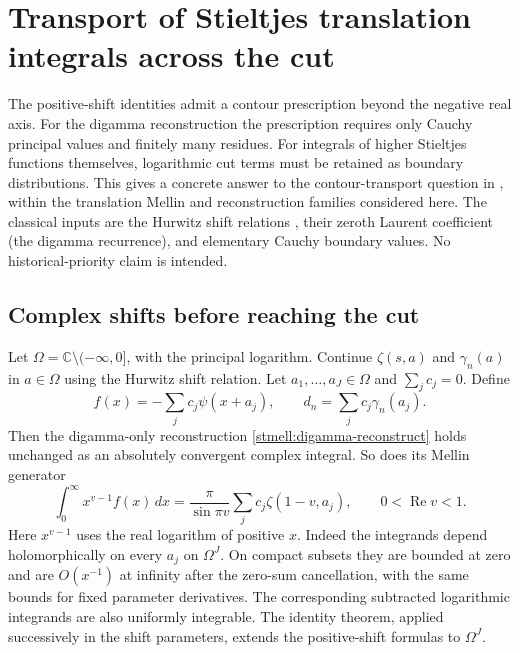 \section{Transport of Stieltjes translation integrals across the cut}
\label{stcut:section}
The positive-shift identities admit a contour prescription beyond the
negative real axis. For the digamma reconstruction the prescription
requires only Cauchy principal values and finitely many residues.
For integrals of higher Stieltjes functions themselves, logarithmic
cut terms must be retained as boundary distributions. This gives a
concrete answer to the contour-transport question in
\cite[Further research, question 2]{stmell:balanced}, within the
translation Mellin and reconstruction families considered here.
The classical inputs are the Hurwitz shift relations
\cite[Eqs.~25.11.3--25.11.4]{intdist:DLMFHurwitz}, their zeroth
Laurent coefficient (the digamma recurrence), and elementary
Cauchy boundary values. No historical-priority claim is intended.

\subsection{Complex shifts before reaching the cut}
Let $\Omega=\mathbb C\setminus(-\infty,0]$, with the principal logarithm.
Continue $\zeta(s,a)$ and $\gamma_n(a)$ in $a\in\Omega$ using the
Hurwitz shift relation. Let $a_1,\ldots,a_J\in\Omega$ and
$\sum_jc_j=0$. Define
\[
 f(x)=-\sum_jc_j\psi(x+a_j),\qquad d_n=\sum_jc_j\gamma_n(a_j).
\]
Then the digamma-only reconstruction \eqref{stmell:digamma-reconstruct}
holds unchanged as an absolutely convergent complex integral. So does
its Mellin generator
\begin{equation}\label{stcut:complex-master}
 \int_0^\infty x^{v-1}f(x)\,dx
  =\frac{\pi}{\sin\pi v}\sum_jc_j\zeta(1-v,a_j),
 \qquad0<\operatorname{Re}v<1.
\end{equation}
Here $x^{v-1}$ uses the real logarithm of positive $x$.
Indeed the integrands depend holomorphically on every $a_j$ on
$\Omega^J$. On compact subsets they are bounded at zero and are
$O(x^{-1})$ at infinity after the zero-sum cancellation, with the
same bounds for fixed parameter derivatives. The corresponding
subtracted logarithmic integrands are also uniformly integrable.
The identity theorem, applied successively in the shift parameters,
extends the positive-shift formulas to $\Omega^J$.

